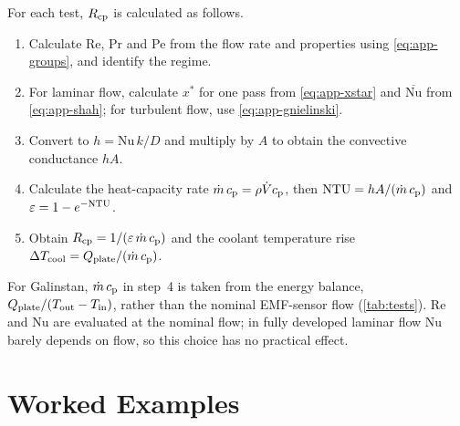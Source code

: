 For each test, $R_{\mathrm{cp}}$ is calculated as follows.
\begin{enumerate}
  \item Calculate Re, Pr and Pe from the flow rate and properties using
    \cref{eq:app-groups}, and identify the regime.
  \item For laminar flow, calculate $x^*$ for one pass from \cref{eq:app-xstar} and
    $\overline{\mathrm{Nu}}$ from \cref{eq:app-shah}; for turbulent flow, use
    \cref{eq:app-gnielinski}.
  \item Convert to $h = \mathrm{Nu}\,k/D$ and multiply by $A$ to obtain the
    convective conductance $hA$.
  \item Calculate the heat-capacity rate $\dot{m}\,c_{\mathrm{p}} = \rho\dot{V}c_{\mathrm{p}}$, then
    $\mathrm{NTU} = hA/(\dot{m}\,c_{\mathrm{p}})$ and $\varepsilon = 1 - e^{-\mathrm{NTU}}$.
  \item Obtain $R_{\mathrm{cp}} = 1/(\varepsilon\,\dot{m}\,c_{\mathrm{p}})$ and the coolant temperature
    rise $\Delta T_{\mathrm{cool}} = Q_{\mathrm{plate}}/(\dot{m}\,c_{\mathrm{p}})$.
\end{enumerate}
For Galinstan, $\dot{m}\,c_{\mathrm{p}}$ in step~4 is taken from the energy balance,
$Q_{\mathrm{plate}}/(T_{\mathrm{out}} - T_{\mathrm{in}})$, rather than the nominal EMF-sensor flow
(\cref{tab:tests}). Re and Nu are evaluated at the nominal flow; in fully
developed laminar flow Nu barely depends on flow, so this choice has no
practical effect.

\section{Worked Examples}

